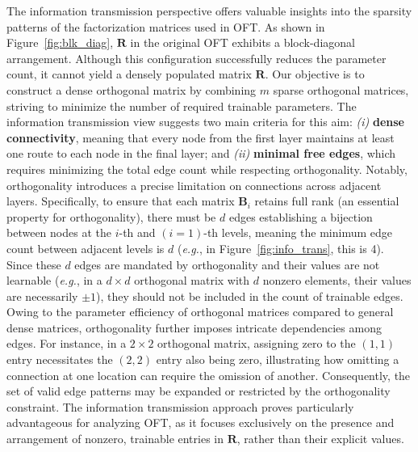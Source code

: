 The information transmission perspective offers valuable insights into the sparsity patterns of the factorization matrices used in OFT. As shown in Figure~\ref{fig:blk_diag}, $\bm{R}$ in the original OFT exhibits a block-diagonal arrangement. Although this configuration successfully reduces the parameter count, it cannot yield a densely populated matrix $\bm{R}$. Our objective is to construct a dense orthogonal matrix by combining $m$ sparse orthogonal matrices, striving to minimize the number of required trainable parameters. The information transmission view suggests two main criteria for this aim: \emph{(i)} \textbf{dense connectivity}, meaning that every node from the first layer maintains at least one route to each node in the final layer; and \emph{(ii)} \textbf{minimal free edges}, which requires minimizing the total edge count while respecting orthogonality. Notably, orthogonality introduces a precise limitation on connections across adjacent layers. Specifically, to ensure that each matrix $\bm{B}_i$ retains full rank (an essential property for orthogonality), there must be $d$ edges establishing a bijection between nodes at the $i$-th and $(i=1)$-th levels, meaning the minimum edge count between adjacent levels is $d$ (\emph{e.g.}, in Figure~\ref{fig:info_trans}, this is 4). Since these $d$ edges are mandated by orthogonality and their values are not learnable (\emph{e.g.}, in a $d\times d$ orthogonal matrix with $d$ nonzero elements, their values are necessarily $\pm 1$), they should not be included in the count of trainable edges. Owing to the parameter efficiency of orthogonal matrices compared to general dense matrices, orthogonality further imposes intricate dependencies among edges. For instance, in a $2\times 2$ orthogonal matrix, assigning zero to the $(1,1)$ entry necessitates the $(2,2)$ entry also being zero, illustrating how omitting a connection at one location can require the omission of another. Consequently, the set of valid edge patterns may be expanded or restricted by the orthogonality constraint. The information transmission approach proves particularly advantageous for analyzing OFT, as it focuses exclusively on the presence and arrangement of nonzero, trainable entries in $\bm{R}$, rather than their explicit values.

